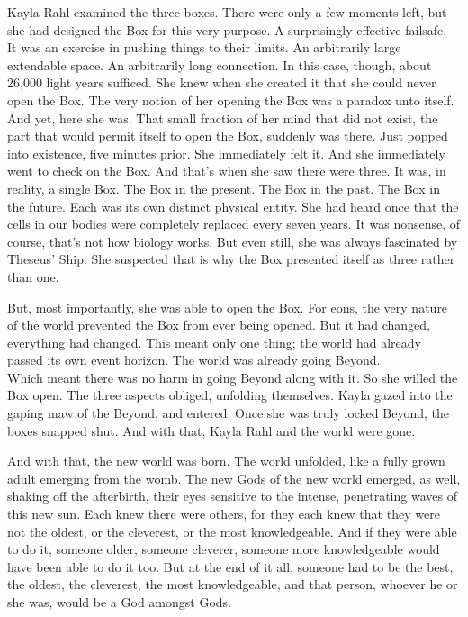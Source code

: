 Kayla Rahl examined the three boxes. There were only a few moments left, but she had designed the Box for this very purpose. A surprisingly effective failsafe.\\It was an exercise in pushing things to their limits. An arbitrarily large extendable space. An arbitrarily long connection. In this case, though, about 26,000 light years sufficed.
\SmallVSpace
She knew when she created it that she could never open the Box. The very notion of her opening the Box was a paradox unto itself. And yet, here she was. That small fraction of her mind that did not exist, the part that would permit itself to open the Box, suddenly was there. Just popped into existence, five minutes prior.
\SmallVSpace
She immediately felt it. And she immediately went to check on the Box. And that’s when she saw there were three. It was, in reality, a single Box. The Box in the present. The Box in the past. The Box in the future. Each was its own distinct physical entity. She had heard once that the cells in our bodies were completely replaced every seven years. It was nonsense, of course, that’s not how biology works. But even still, she was always fascinated by Theseus’ Ship. She suspected that is why the Box presented itself as three rather than one.

But, most importantly, she was able to open the Box. For eons, the very nature of the world prevented the Box from ever being opened. But it had changed, everything had changed. This meant only one thing; the world had already passed its own event horizon. The world was already going Beyond.
\\
Which meant there was no harm in going Beyond along with it.
\SmallVSpace
So she willed the Box open. The three aspects obliged, unfolding themselves. Kayla gazed into the gaping maw of the Beyond, and entered.
\SmallVSpace
Once she was truly locked Beyond, the boxes snapped shut.
\SomeVSpace
And with that, Kayla Rahl and the world were gone.
\simpleline

And with that, the new world was born.
\SomeVSpace
The world unfolded, like a fully grown adult emerging from the womb. The new Gods of the new world emerged, as well, shaking off the afterbirth, their eyes sensitive to the intense, penetrating waves of this new sun.
\SmallVSpace
Each knew there were others, for they each knew that they were not the oldest, or the cleverest, or the most knowledgeable. And if they were able to do it, someone older, someone cleverer, someone more knowledgeable would have been able to do it too.
\SmallVSpace
But at the end of it all, someone had to be the best, the oldest, the cleverest, the most knowledgeable, and that person, whoever he or she was, would be a God amongst Gods.